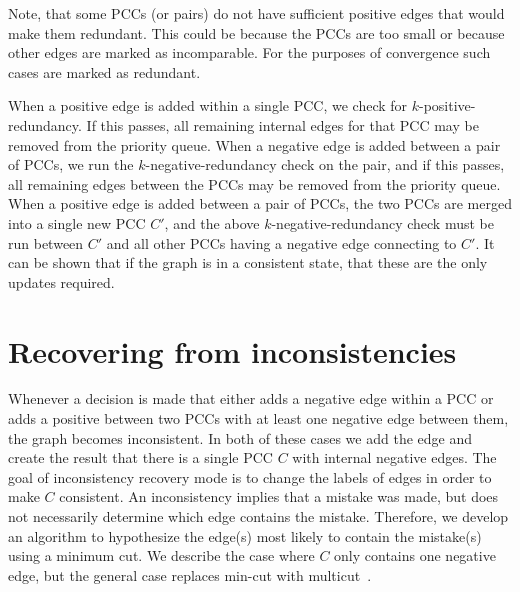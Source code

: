 %

Note, that some PCCs (or pairs) do not have sufficient positive edges that
  would make them redundant.
This could be because the PCCs are too small or because other edges are marked
  as incomparable.
For the purposes of convergence such cases are marked as redundant.

When a positive edge is added within a single PCC, we check for
  $k$-positive-redundancy.
If this passes, all remaining internal edges for that PCC may be  removed from
  the priority queue.
When a negative edge is added between a pair of PCCs, we run the
  $k$-negative-redundancy check on the pair, and if this passes, all remaining
  edges between the PCCs may be removed from the priority queue.
When a positive edge is added between a pair of PCCs, the two PCCs are merged
  into a single new PCC $C'$, and the above $k$-negative-redundancy check must
  be run between $C'$ and all other PCCs having a negative edge connecting to
  $C'$.
It can be shown that if the graph is in a consistent state, that these are the
  only updates required.

\section{Recovering from inconsistencies}\label{sec:incon}
Whenever a decision is made that either adds a negative edge within a PCC or
  adds a positive between two PCCs with at least one negative edge between them,
  the graph becomes inconsistent.
In both of these cases we add the edge and create the result that there is a
  single PCC $C$ with internal negative edges.
The goal of inconsistency recovery mode is to change the labels of edges in
  order to make $C$ consistent.
An inconsistency implies that a mistake was made, but does not necessarily
  determine which edge contains the mistake.
Therefore, we develop an algorithm to hypothesize the edge(s) most likely to
  contain the mistake(s) using a minimum cut.
We describe the case where $C$ only contains one negative edge, but the
  general case replaces min-cut with
  multicut~\cite{vazirani_approximation_2013}.

